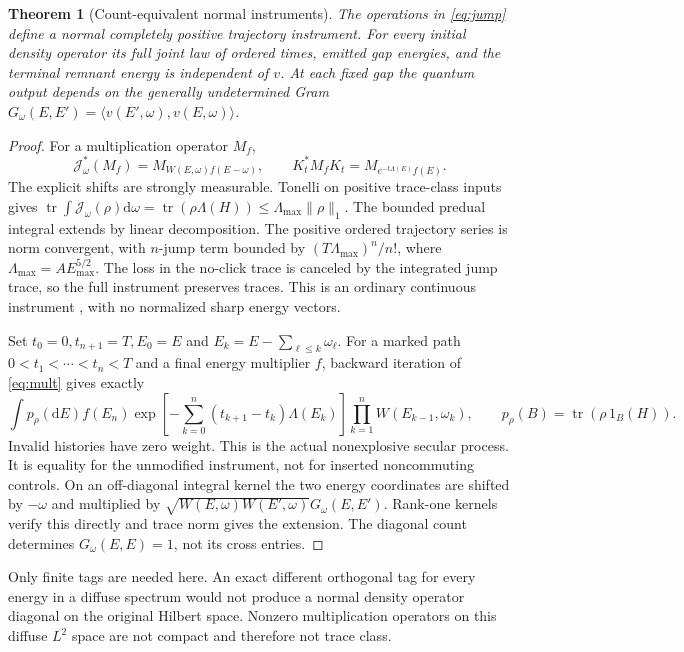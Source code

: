 \documentclass[11pt]{article}
\newtheorem{theorem}{Theorem}
\newcommand{\dd}{\mathrm d}
\newcommand{\tr}{\operatorname{tr}}
\begin{document}
\begin{theorem}[Count-equivalent normal instruments]
\label{thm:count}
The operations in \eqref{eq:jump} define a normal completely positive trajectory instrument. For every initial density operator its full joint law of ordered times, emitted gap energies, and the terminal remnant energy is independent of \(v\). At each fixed gap the quantum output depends on the generally undetermined Gram \(G_\omega(E,E')=\langle v(E',\omega),v(E,\omega)\rangle\).
\end{theorem}
\begin{proof}
For a multiplication operator \(M_f\),
\begin{equation}
 \mathcal J_\omega^*(M_f)=M_{W(E,\omega)f(E-\omega)},\qquad
 K_t^*M_fK_t=M_{e^{-t\Lambda(E)}f(E)}.                              \label{eq:mult}
\end{equation}
The explicit shifts are strongly measurable. Tonelli on positive trace-class inputs gives \(\tr\int\mathcal J_\omega(\rho)\dd\omega=\tr(\rho\Lambda(H))\le\Lambda_{\max}\|\rho\|_1\). The bounded predual integral extends by linear decomposition. The positive ordered trajectory series is norm convergent, with \(n\)-jump term bounded by \((T\Lambda_{\max})^n/n!\), where \(\Lambda_{\max}=AE_{\max}^{5/2}\). The loss in the no-click trace is canceled by the integrated jump trace, so the full instrument preserves traces. This is an ordinary continuous instrument \cite{davies}, with no normalized sharp energy vectors.

Set \(t_0=0,t_{n+1}=T,E_0=E\) and \(E_k=E-\sum_{\ell\le k}\omega_\ell\). For a marked path \(0<t_1<\cdots<t_n<T\) and a final energy multiplier \(f\), backward iteration of \eqref{eq:mult} gives exactly
\[
 \int p_\rho(\dd E) f(E_n)
       \exp\!\left[-\sum_{k=0}^n (t_{k+1}-t_k)\Lambda(E_k)\right]
       \prod_{k=1}^n W(E_{k-1},\omega_k),\qquad
 p_\rho(B)=\tr(\rho\,1_B(H)).
\]
Invalid histories have zero weight. This is the actual nonexplosive secular process. It is equality for the unmodified instrument, not for inserted noncommuting controls. On an off-diagonal integral kernel the two energy coordinates are shifted by \(-\omega\) and multiplied by
\(\sqrt{W(E,\omega)W(E',\omega)}G_\omega(E,E')\).
Rank-one kernels verify this directly and trace norm gives the extension. The diagonal count determines \(G_\omega(E,E)=1\), not its cross entries.
\end{proof}
Only finite tags are needed here. An exact different orthogonal tag for every energy in a diffuse spectrum would not produce a normal density operator diagonal on the original Hilbert space. Nonzero multiplication operators on this diffuse \(L^2\) space are not compact and therefore not trace class.
\end{document}
